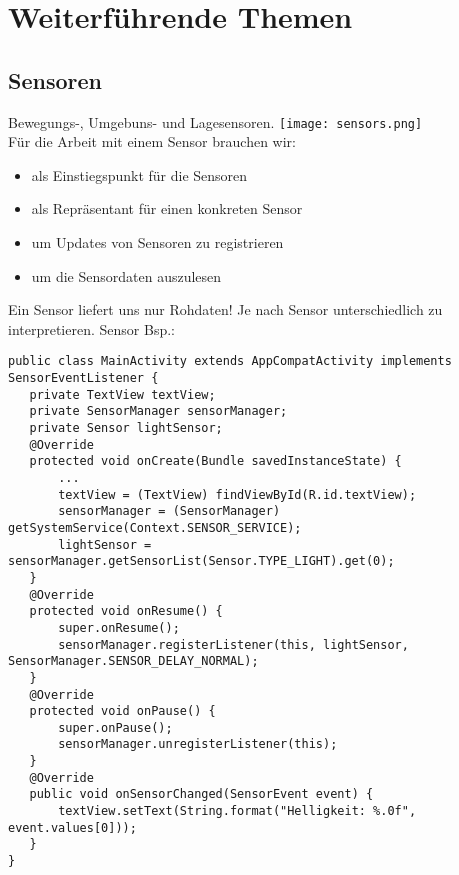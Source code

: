 \section{Weiterführende Themen}
\subsection{Sensoren}
Bewegungs-, Umgebuns- und Lagesensoren.
\texttt{[image: sensors.png]} \\
Für die Arbeit mit einem Sensor brauchen wir:
\begin{itemize}
\item {} als Einstiegspunkt für die Sensoren
\item {} als Repräsentant für einen konkreten Sensor
\item {} um Updates von Sensoren zu registrieren
\item {} um die Sensordaten auszulesen
\end{itemize}
Ein Sensor liefert uns nur Rohdaten! Je nach Sensor unterschiedlich zu interpretieren. Sensor Bsp.:
\begin{lstlisting}
public class MainActivity extends AppCompatActivity implements SensorEventListener {
   private TextView textView;
   private SensorManager sensorManager;
   private Sensor lightSensor;
   @Override
   protected void onCreate(Bundle savedInstanceState) {
       ...
       textView = (TextView) findViewById(R.id.textView);
       sensorManager = (SensorManager) getSystemService(Context.SENSOR_SERVICE);
       lightSensor = sensorManager.getSensorList(Sensor.TYPE_LIGHT).get(0);
   }
   @Override
   protected void onResume() {
       super.onResume();
       sensorManager.registerListener(this, lightSensor, SensorManager.SENSOR_DELAY_NORMAL);
   }
   @Override
   protected void onPause() {
       super.onPause();
       sensorManager.unregisterListener(this);
   }
   @Override
   public void onSensorChanged(SensorEvent event) {
       textView.setText(String.format("Helligkeit: %.0f", event.values[0]));
   }
}
\end{lstlisting}
